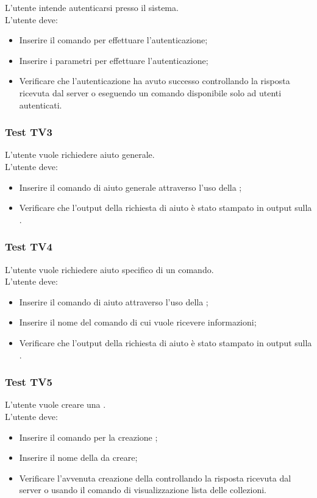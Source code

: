 \documentclass{scalatekids-article}
\begin{document}
L'utente intende autenticarsi presso il sistema.\\
L'utente deve:
\begin{itemize}
\item Inserire il comando per effettuare l'autenticazione;
\item Inserire i parametri per effettuare l'autenticazione;
\item Verificare che l'autenticazione ha avuto successo controllando la 
risposta ricevuta dal server o eseguendo un comando 
disponibile solo ad utenti autenticati.
\end{itemize}

\subsubsection{Test TV3}
\label{sec:TV3}

L'utente vuole richiedere aiuto generale.\\
L'utente deve:
\begin{itemize}
\item Inserire il comando di aiuto generale attraverso l'uso della ;
\item Verificare che l'output della richiesta di aiuto è stato stampato in 
output sulla .
\end{itemize}

\subsubsection{Test TV4}
\label{sec:TV4}

L'utente vuole richiedere aiuto specifico di un comando.\\
L'utente deve:
\begin{itemize}
\item Inserire il comando di aiuto attraverso l'uso della ;
\item Inserire il nome del comando di cui vuole ricevere informazioni;
\item Verificare che l'output della richiesta di aiuto è stato stampato in 
output sulla .
\end{itemize}

\subsubsection{Test TV5}

L'utente vuole creare una .\\
L'utente deve:
\begin{itemize}
\item Inserire il comando per la creazione ;
\item Inserire il nome della  da creare;
\item Verificare l'avvenuta creazione della  controllando la 
risposta ricevuta dal server o usando il comando di visualizzazione 
lista delle collezioni.
\end{itemize}
\end{document}
